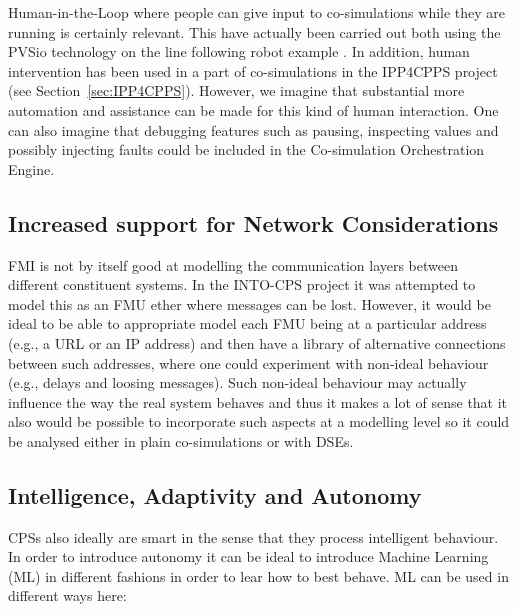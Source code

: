 Human-in-the-Loop where people can give input to co-simulations while they are running is certainly relevant. This have actually been carried out both using the PVSio technology on the line following robot example \cite{Palmieri&17}. In addition, human intervention has been used in a part of co-simulations in the IPP4CPPS project (see Section~\ref{sec:IPP4CPPS}). However, we imagine that substantial more automation and assistance can be made for this kind of human interaction. One can also imagine that debugging features such as pausing, inspecting values and possibly injecting faults could be included in the Co-simulation Orchestration Engine.


\subsection{Increased support for Network Considerations}

FMI is not by itself good at modelling the communication layers between different constituent systems. In the INTO-CPS project it was attempted to model this as an FMU ether where messages can be lost. However, it would be ideal to be able to appropriate model each FMU being at a particular address (e.g., a URL or an IP address) and then have a library of alternative connections between such addresses, where one could experiment with non-ideal behaviour (e.g., delays and loosing messages). Such non-ideal behaviour may actually influence the way the real system behaves and thus it makes a lot of sense that it also would be possible to incorporate such aspects at a modelling level so it could be analysed either in plain co-simulations or with DSEs.


\subsection{Intelligence, Adaptivity and Autonomy}

CPSs also ideally are smart in the sense that they process intelligent behaviour. In order to introduce autonomy it can be ideal to introduce Machine Learning (ML) in different fashions in order to lear how to best behave. ML can be used in different ways here:

